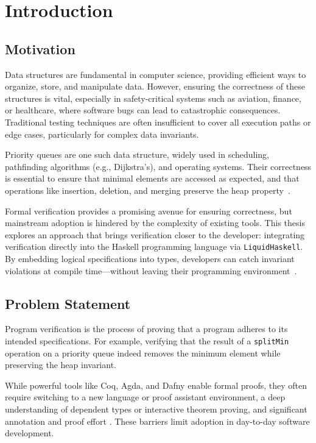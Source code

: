 \chapter{Introduction} %

\section{Motivation}
Data structures are fundamental in computer science, providing efficient ways
to organize, store, and manipulate data.
However, ensuring the correctness of
these structures is vital, especially in safety-critical systems such as
aviation, finance, or healthcare, where software bugs can lead to catastrophic
consequences.
Traditional testing techniques are often insufficient to cover all execution paths or edge cases, particularly for complex data invariants.


Priority queues are one such data structure, widely used in scheduling,
pathfinding algorithms (e.g., Dijkstra’s), and operating systems.
Their correctness is essential to ensure that minimal elements are accessed as expected,
and that operations like insertion, deletion, and merging preserve the heap property~\cite{okasaki}.

Formal verification provides a promising avenue for ensuring correctness,
but mainstream adoption is hindered by the complexity of existing tools.
This thesis explores an approach that brings verification closer to the developer:
integrating verification directly into the Haskell programming language via \texttt{LiquidHaskell}.
By embedding logical specifications into types,
developers can catch invariant violations at compile time—without leaving their programming environment~\cite{rondonLiquidTypes2008}.

\section{Problem Statement}
Program verification is the process of proving that a program adheres to its
intended specifications.
For example, verifying that the result of a \texttt{splitMin} operation on a priority queue indeed removes the minimum element while preserving the heap invariant.

While powerful tools like Coq, Agda, and Dafny enable formal proofs,
they often require switching to a new language or proof assistant environment, a
deep understanding of dependent types or interactive theorem proving, and significant annotation and proof effort \cite{vazou2018}.
These barriers limit adoption in day-to-day software development.

